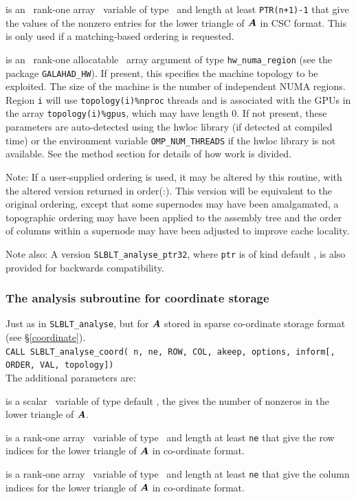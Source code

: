 \documentclass{galahad}
\newcommand{\packagename}{SLBLT}
\begin{document}
\begin{description}
 is an \optional\ rank-one array \intentin\ variable of type \realdp\
and length at least {\tt PTR(n+1)-1} that give the values of the
nonzero entries for the lower triangle of ${\bm{A}}$ in CSC format.
This is only used if a matching-based ordering is requested.

 is an \optional\ rank-one allocatable \intentin\ array argument 
of type {\tt hw\_numa\_region} (see the package {\tt GALAHAD\_HW}).
If present, this specifies the machine topology
to be exploited. The size of the machine is the number of independent
NUMA regions. Region {\tt i} will use {\tt topology(i)\%nproc} threads and is
associated with the GPUs in the array {\tt topology(i)\%gpus}, which may have
length 0. If not present, these parameters are auto-detected using
the hwloc library (if detected at compiled time) or the environment
variable {\tt OMP\_NUM\_THREADS} if the hwloc library is not available. See
the method section for details of how work is divided.

\end{description}
Note:
If a user-supplied ordering is used, it may be altered by this routine,
with the altered version returned in order(:). This version will be
equivalent to the original ordering, except that some supernodes may have
been amalgamated, a topographic ordering may have been applied to the
assembly tree and the order of columns within a supernode may have been
adjusted to improve cache locality.

\noindent
Note also:
A version {\tt \packagename\_analyse\_ptr32},
where {\tt ptr} is of kind default \integer, is also provided for
backwards compatibility.


\subsubsection{The analysis subroutine for coordinate storage}

Just as in {\tt \packagename\_analyse}, but for ${\bm{A}}$ stored in
sparse co-ordinate storage format (see \S\ref{coordinate}). \\

\hskip0.1in
{\tt CALL \packagename\_analyse\_coord( n, ne, ROW, COL, akeep, options, inform{[}, ORDER, VAL, topology{]})}
\\

\noindent
The additional parameters are:
\begin{description}
 is a scalar \intentin\ variable of type default \integer,
the gives the number of nonzeros in the lower triangle of ${\bm{A}}$.

 is a rank-one array \intentin\ variable of type \integer\
and length at least {\tt ne} that give the 
row indices for the lower triangle of ${\bm{A}}$ in co-ordinate format.

\itt{COL} is a rank-one array \intentin\ variable of type \integer\
and length at least {\tt ne} that give the 
column indices for the lower triangle of ${\bm{A}}$ in co-ordinate format.

\end{description}
\end{document}
